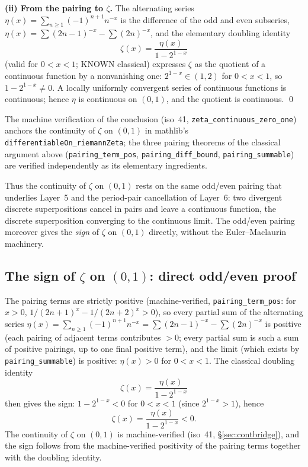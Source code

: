 \documentclass{article}
\newcommand{\zt}{\zeta}
\begin{document}
\textbf{(ii) From the pairing to $\zt$.} The alternating series
$\eta(x)=\sum_{n\ge1}(-1)^{n+1}n^{-x}$ is the difference of the odd and
even subseries, $\eta(x)=\sum(2n-1)^{-x}-\sum(2n)^{-x}$, and the elementary
doubling identity
\[
\zt(x)=\frac{\eta(x)}{1-2^{1-x}}
\]
(valid for $0<x<1$; KNOWN classical) expresses $\zt$ as the quotient of a
continuous function by a nonvanishing one: $2^{1-x}\in(1,2)$ for
$0<x<1$, so $1-2^{1-x}\neq0$. A locally uniformly convergent series of
continuous functions is continuous; hence $\eta$ is continuous on $(0,1)$,
and the quotient is continuous. \qed

The machine verification of the conclusion (iso~41,
\texttt{zeta\_continuous\_zero\_one}) anchors the continuity of $\zt$ on
$(0,1)$ in mathlib's \texttt{differentiableOn\_riemannZeta}; the three
pairing theorems of the classical argument above
(\texttt{pairing\_term\_pos}, \texttt{pairing\_diff\_bound},
\texttt{pairing\_summable}) are verified independently as its elementary
ingredients.

Thus the continuity of $\zt$ on $(0,1)$ rests on the same odd/even pairing
that underlies Layer~5 and the period-pair cancellation of Layer~6: two
divergent discrete superpositions cancel in pairs and leave a continuous
function, the discrete superposition converging to the continuous limit.
The odd/even pairing moreover gives the \emph{sign} of $\zt$ on $(0,1)$
directly, without the Euler--Maclaurin machinery.

\subsection{The sign of $\zt$ on $(0,1)$: direct odd/even proof}
\label{sec:blocksCG}

The pairing terms are strictly positive (machine-verified,
\texttt{pairing\_term\_pos}: for $x>0$,
$1/(2n+1)^x-1/(2n+2)^x>0$), so every partial sum of the alternating series
$\eta(x)=\sum_{n\ge1}(-1)^{n+1}n^{-x}=\sum(2n-1)^{-x}-\sum(2n)^{-x}$ is
positive (each pairing of adjacent terms contributes $>0$; every
partial sum is such a sum of positive pairings, up to one final positive
term), and the limit (which exists by \texttt{pairing\_summable}) is
positive: $\eta(x)>0$ for $0<x<1$. The classical doubling identity
\[
\zt(x)=\frac{\eta(x)}{1-2^{1-x}}
\]
then gives the sign: $1-2^{1-x}<0$ for $0<x<1$ (since $2^{1-x}>1$), hence
\[
\zt(x)=\frac{\eta(x)}{1-2^{1-x}}<0.
\]
The continuity of $\zt$ on $(0,1)$ is machine-verified (iso~41,
\S\ref{sec:contbridge}), and the sign follows from the machine-verified
positivity of the pairing terms together with the doubling identity.
\end{document}
